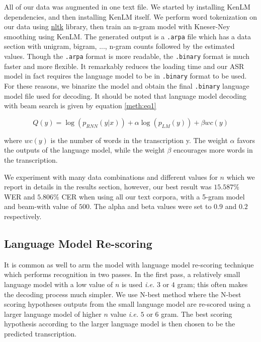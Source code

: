 All of our data was augmented in one text file. We started by installing KenLM dependencies, and then installing KenLM itself. We perform word tokenization on our data using \href{https://www.nltk.org/}{nltk} library, then train an n-gram model with Kneser-Ney smoothing using KenLM. The generated output is a \texttt{.arpa} file which has a data section with unigram, bigram, ..., n-gram counts followed by the estimated values. Though the \texttt{.arpa} format is more readable, the \texttt{.binary} format is much faster and more flexible. It remarkably reduces the loading time and our \ac{ASR} model in fact requires the language model to be in \texttt{.binary} format to be used. For these reasons, we binarize the model and obtain the final \texttt{.binary} language model file used for decoding. It should be noted that language model decoding with beam search is given by equation \ref{meth:eq1}

\begin{equation}
\label{meth:eq1}
Q(y) = \log(p_{RNN}(y|x)) + \alpha \log(p_{LM}(y)) + \beta wc(y)
\end{equation}

where $wc(y)$ is the number of words in the transcription y. The weight $\alpha$ favors the outputs of the language model, while the weight $\beta$ encourages more words in the transcription.

We experiment with many data combinations and different values for $n$ which we report in details in the results section, however, our best result was $15.587\%$ \ac{WER} and $5.806\%$ \ac{CER} when using all our text corpora, with a 5-gram model and beam-with value of $500$. The alpha and beta values were set to $0.9$ and $0.2$ respectively.

\subsection{Language Model Re-scoring}
\label{meth:s4_sub6}

It is common as well to arm the model with language model re-scoring technique which performs recognition in two passes. In the first pass, a relatively small language model with a low value of $n$ is used \textit{i.e.} $3$ or $4$ gram; this often makes the decoding process much simpler. We use N-best method where the N-best scoring hypotheses outputs from the small language model are re-scored using a larger language model of higher $n$ value \textit{i.e.} $5$ or $6$ gram. The best scoring hypothesis according to the larger language model is then chosen to be the predicted transcription.



